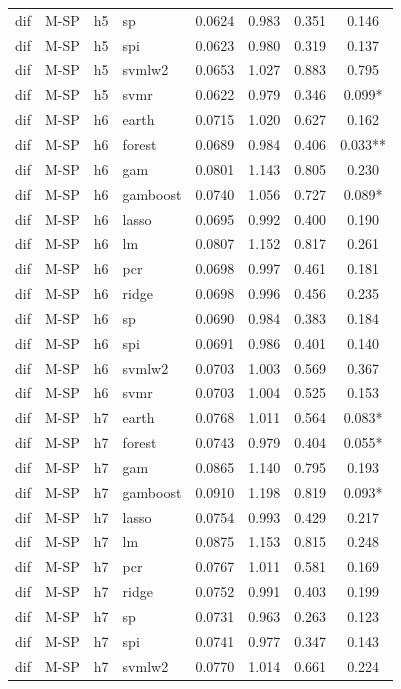 \begin{ThreePartTable}
\begin{longtable}[t]{llclcccc}
dif & M-SP & h5 & sp & 0.0624 & 0.983 & 0.351 & 0.146\\
dif & M-SP & h5 & spi & 0.0623 & 0.980 & 0.319 & 0.137\\
dif & M-SP & h5 & svmlw2 & 0.0653 & 1.027 & 0.883 & 0.795\\
dif & M-SP & h5 & svmr & 0.0622 & 0.979 & 0.346 & 0.099*\\
\addlinespace
dif & M-SP & h6 & earth & 0.0715 & 1.020 & 0.627 & 0.162\\
dif & M-SP & h6 & forest & 0.0689 & 0.984 & 0.406 & 0.033**\\
dif & M-SP & h6 & gam & 0.0801 & 1.143 & 0.805 & 0.230\\
dif & M-SP & h6 & gamboost & 0.0740 & 1.056 & 0.727 & 0.089*\\
dif & M-SP & h6 & lasso & 0.0695 & 0.992 & 0.400 & 0.190\\
dif & M-SP & h6 & lm & 0.0807 & 1.152 & 0.817 & 0.261\\
dif & M-SP & h6 & pcr & 0.0698 & 0.997 & 0.461 & 0.181\\
dif & M-SP & h6 & ridge & 0.0698 & 0.996 & 0.456 & 0.235\\
dif & M-SP & h6 & sp & 0.0690 & 0.984 & 0.383 & 0.184\\
dif & M-SP & h6 & spi & 0.0691 & 0.986 & 0.401 & 0.140\\
dif & M-SP & h6 & svmlw2 & 0.0703 & 1.003 & 0.569 & 0.367\\
dif & M-SP & h6 & svmr & 0.0703 & 1.004 & 0.525 & 0.153\\
\addlinespace
dif & M-SP & h7 & earth & 0.0768 & 1.011 & 0.564 & 0.083*\\
dif & M-SP & h7 & forest & 0.0743 & 0.979 & 0.404 & 0.055*\\
dif & M-SP & h7 & gam & 0.0865 & 1.140 & 0.795 & 0.193\\
dif & M-SP & h7 & gamboost & 0.0910 & 1.198 & 0.819 & 0.093*\\
dif & M-SP & h7 & lasso & 0.0754 & 0.993 & 0.429 & 0.217\\
dif & M-SP & h7 & lm & 0.0875 & 1.153 & 0.815 & 0.248\\
dif & M-SP & h7 & pcr & 0.0767 & 1.011 & 0.581 & 0.169\\
dif & M-SP & h7 & ridge & 0.0752 & 0.991 & 0.403 & 0.199\\
dif & M-SP & h7 & sp & 0.0731 & 0.963 & 0.263 & 0.123\\
dif & M-SP & h7 & spi & 0.0741 & 0.977 & 0.347 & 0.143\\
dif & M-SP & h7 & svmlw2 & 0.0770 & 1.014 & 0.661 & 0.224\\

\end{longtable}
\end{ThreePartTable}
